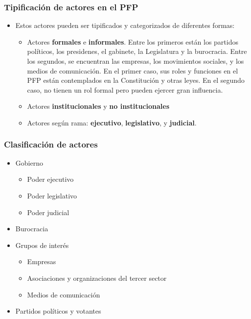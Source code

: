 \documentclass[14pt,aspectratio=169]{beamer}
\begin{document}
        \begin{frame}\frametitle{Tipificación de actores en el PFP}
          \begin{itemize}
      \item Estos actores pueden ser tipificados y categorizados de
        diferentes formas:
        \begin{itemize}
          \item Actores \textbf{formales} e
        \textbf{informales}. Entre los primeros están los partidos
        políticos, los presidenes, el gabinete, la Legislatura y la
        burocracia. Entre los segundos, se encuentran las empresas,
        los movimientos sociales, y los medios de comunicación. En el primer caso, sus roles y funciones en el PFP están
          contemplados en la Constitución y otras leyes. En el segundo
          caso, no tienen un rol formal pero pueden ejercer gran
          influencia.
          \item Actores \textbf{institucionales} y \textbf{no
              institucionales}
            \item Actores según rama: \textbf{ejecutivo},
              \textbf{legislativo}, y \textbf{judicial}.
              \end{itemize}
            \end{itemize}
    \end{frame}


    \begin{frame}\frametitle{Clasificación de actores}
      \begin{itemize}
      \item Gobierno
        \begin{itemize}
        \item Poder ejecutivo
        \item Poder legislativo
        \item Poder judicial
          \end{itemize}
        \item Burocracia
        \item Grupos de interés
          \begin{itemize}
          \item Empresas
          \item Asociaciones y organizaciones del tercer sector
          \item Medios de comunicación
          \end{itemize}
        \item Partidos políticos y votantes
        \end{itemize}
          \end{frame}
\end{document}
